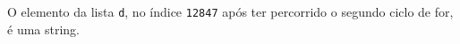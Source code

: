 \documentclass[12pt,varwidth=16cm,border=1pt]{standalone}
\begin{document}
O elemento da lista \verb+d+, no índice \verb+12847+ após ter percorrido o segundo ciclo de for, é uma string.

\questiomfalse
\end{document}

